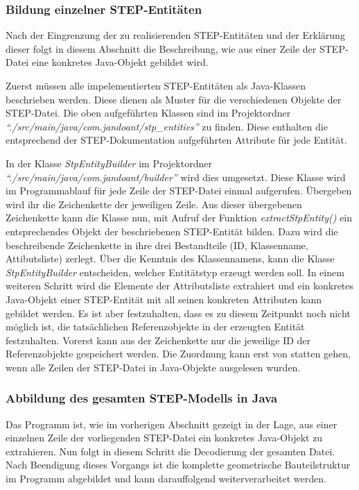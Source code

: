 \subsubsection{Bildung einzelner STEP-Entitäten}
\label{sec:string2entity}


Nach der Eingrenzung der zu realisierenden STEP-Entitäten und der Erklärung dieser folgt in diesem Abschnitt die Beschreibung, wie aus einer Zeile der STEP-Datei eine konkretes Java-Objekt gebildet wird. 

Zuerst müssen alle impelementierten STEP-Entitäten als Java-Klassen beschrieben werden. Diese dienen als Muster für die verschiedenen Objekte der STEP-Datei. Die oben aufgeführten Klassen sind im Projektordner \textit{"`./src/main/java/com.jandoant/stp\_entities"'} zu finden. Diese enthalten die entsprechend der STEP-Dokumentation aufgeführten Attribute für jede Entität. 

In der Klasse \textit{StpEntityBuilder} im Projektordner \textit{"`./src/main/java/com.jandoant/builder"'} wird dies umgesetzt. Diese Klasse wird im Programmablauf für jede Zeile der STEP-Datei einmal aufgerufen. Übergeben wird ihr die Zeichenkette der jeweiligen Zeile. Aus dieser übergebenen Zeichenkette kann die Klasse nun, mit Aufruf der Funktion \textit{extractStpEntity()} ein entsprechendes Objekt der beschriebenen STEP-Entität bilden. 
Dazu wird die beschreibende Zeichenkette in ihre drei Bestandteile (ID, Klassenname, Attibutsliste) zerlegt. Über die Kenntnis des Klassennamens, kann die Klasse \textit{StpEntityBuilder} entscheiden, welcher Entitätstyp erzeugt werden soll. In einem weiteren Schritt wird die Elemente der Attributsliste extrahiert und ein konkretes Java-Objekt einer STEP-Entität mit all seinen konkreten Attributen kann gebildet werden. Es ist aber festzuhalten, dass es zu diesem Zeitpunkt noch nicht möglich ist, die tatsächlichen Referenzobjekte in der erzeugten Entität festzuhalten. Vorerst kann aus der Zeichenkette nur die jeweilige ID der Referenzobjekte gespeichert werden. Die Zuordnung kann erst von statten gehen, wenn alle Zeilen der STEP-Datei in Java-Objekte ausgelesen wurden.

\subsubsection{Abbildung des gesamten STEP-Modells in Java} 

Das Programm ist, wie im vorherigen Abschnitt gezeigt in der Lage, aus einer einzelnen Zeile der vorliegenden STEP-Datei ein konkretes Java-Objekt zu extrahieren. Nun folgt in diesem Schritt die Decodierung der gesamten Datei. Nach Beendigung dieses Vorgangs ist die komplette geometrische Bauteilstruktur im Programm abgebildet und kann darauffolgend weiterverarbeitet werden.

